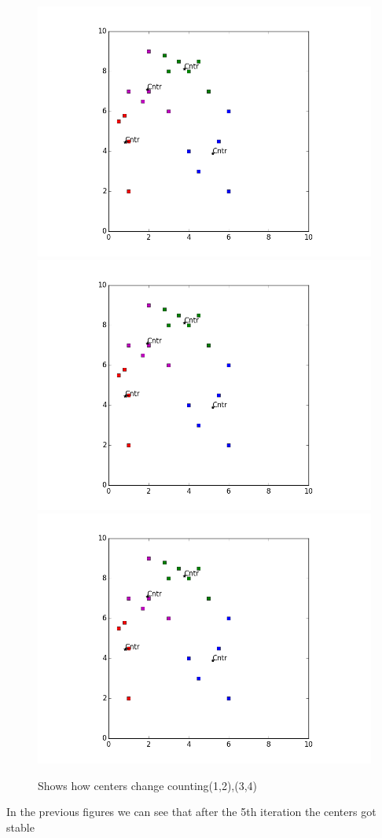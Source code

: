 \documentclass{article}
\begin{document}
\begin{figure}[H]
\includegraphics[scale=0.5,trim={3cm 1cm 3cm 1cm},clip]{6.png}\\
\includegraphics[scale=0.5,trim={3cm 1cm 3cm 1cm},clip]{7.png}
\includegraphics[scale=0.5,trim={3cm 1cm 3cm 1cm},clip]{8.png}
\caption{Shows how centers change counting(1,2),(3,4)}
\end{figure}
In the previous figures we can see that after the 5th iteration the centers got stable 
\end{document}
